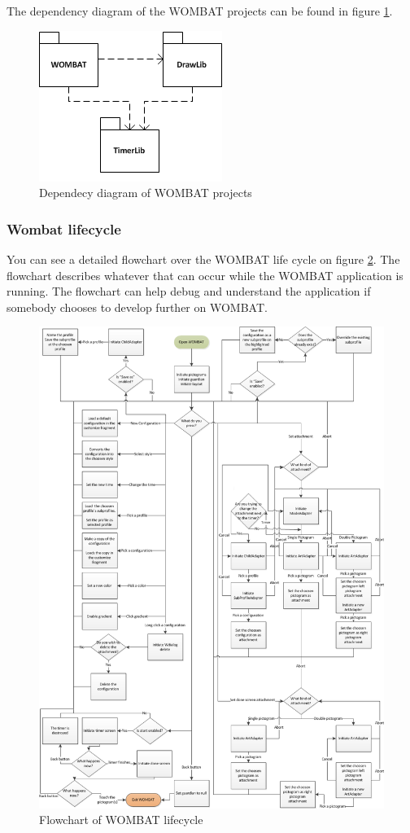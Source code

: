 The dependency diagram of the WOMBAT projects can be found in figure \ref{fig:LibraryDependency}.

\begin{figure}[H]
	\centering
		\includegraphics[scale=0.6]{Images/Implementation/LibraryDependency.png}
	\caption{Dependecy diagram of WOMBAT projects}
	\label{fig:LibraryDependency}
\end{figure}

\subsubsection{Wombat lifecycle}
You can see a detailed flowchart over the WOMBAT life cycle on figure \ref{fig:wombatLifeCycle}. The flowchart describes whatever that can occur while the WOMBAT application is running. The flowchart can help debug and understand the application if somebody chooses to develop further on WOMBAT.

\begin{figure}[H]
	\centering
		\includegraphics[scale=0.6]{Images/Implementation/wombatLifeCycle.png}
	\caption{Flowchart of WOMBAT lifecycle}
	\label{fig:wombatLifeCycle}
\end{figure}